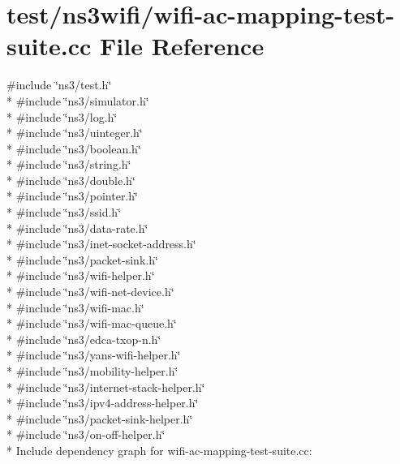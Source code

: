 \hypertarget{wifi-ac-mapping-test-suite_8cc}{}\section{test/ns3wifi/wifi-\/ac-\/mapping-\/test-\/suite.cc File Reference}
\label{wifi-ac-mapping-test-suite_8cc}
{\ttfamily \#include \char`\"{}ns3/test.\+h\char`\"{}}\\*
{\ttfamily \#include \char`\"{}ns3/simulator.\+h\char`\"{}}\\*
{\ttfamily \#include \char`\"{}ns3/log.\+h\char`\"{}}\\*
{\ttfamily \#include \char`\"{}ns3/uinteger.\+h\char`\"{}}\\*
{\ttfamily \#include \char`\"{}ns3/boolean.\+h\char`\"{}}\\*
{\ttfamily \#include \char`\"{}ns3/string.\+h\char`\"{}}\\*
{\ttfamily \#include \char`\"{}ns3/double.\+h\char`\"{}}\\*
{\ttfamily \#include \char`\"{}ns3/pointer.\+h\char`\"{}}\\*
{\ttfamily \#include \char`\"{}ns3/ssid.\+h\char`\"{}}\\*
{\ttfamily \#include \char`\"{}ns3/data-\/rate.\+h\char`\"{}}\\*
{\ttfamily \#include \char`\"{}ns3/inet-\/socket-\/address.\+h\char`\"{}}\\*
{\ttfamily \#include \char`\"{}ns3/packet-\/sink.\+h\char`\"{}}\\*
{\ttfamily \#include \char`\"{}ns3/wifi-\/helper.\+h\char`\"{}}\\*
{\ttfamily \#include \char`\"{}ns3/wifi-\/net-\/device.\+h\char`\"{}}\\*
{\ttfamily \#include \char`\"{}ns3/wifi-\/mac.\+h\char`\"{}}\\*
{\ttfamily \#include \char`\"{}ns3/wifi-\/mac-\/queue.\+h\char`\"{}}\\*
{\ttfamily \#include \char`\"{}ns3/edca-\/txop-\/n.\+h\char`\"{}}\\*
{\ttfamily \#include \char`\"{}ns3/yans-\/wifi-\/helper.\+h\char`\"{}}\\*
{\ttfamily \#include \char`\"{}ns3/mobility-\/helper.\+h\char`\"{}}\\*
{\ttfamily \#include \char`\"{}ns3/internet-\/stack-\/helper.\+h\char`\"{}}\\*
{\ttfamily \#include \char`\"{}ns3/ipv4-\/address-\/helper.\+h\char`\"{}}\\*
{\ttfamily \#include \char`\"{}ns3/packet-\/sink-\/helper.\+h\char`\"{}}\\*
{\ttfamily \#include \char`\"{}ns3/on-\/off-\/helper.\+h\char`\"{}}\\*
Include dependency graph for wifi-\/ac-\/mapping-\/test-\/suite.cc\+:
